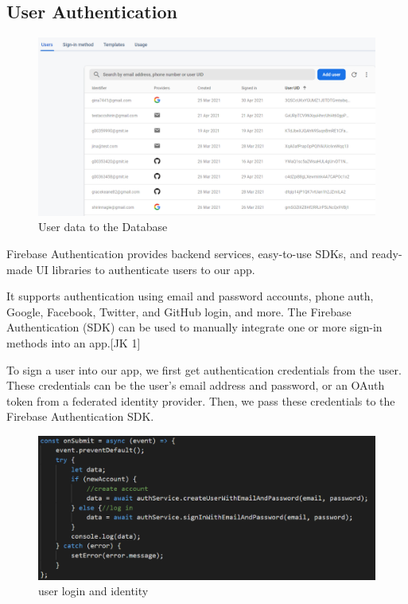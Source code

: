 \subsection{User Authentication}

\begin{figure}[ht]
    \centering
    \includegraphics[scale=0.5]{img/auth.PNG}
    \caption{User data to the Database}
    \label{fig:my_labe2}
\end{figure}

Firebase Authentication provides backend services, easy-to-use SDKs, and ready-made UI libraries to authenticate users to our app.

It supports authentication using email and password accounts, phone auth, Google, Facebook, Twitter, and GitHub login, and more. The Firebase Authentication (SDK) can be used to manually integrate one or more sign-in methods into an app.[JK 1]

\vspace{5mm}

To sign a user into our app, we first get authentication credentials from the user. 
These credentials can be the user's email address and password, or an OAuth token from a federated identity provider. Then, we pass these credentials to the Firebase Authentication SDK. 

\begin{figure}[ht]
    \centering
    \includegraphics[scale=0.55]{img/login.PNG}
    \caption{user login and identity}
    \label{fig:my_labe3}
\end{figure}

